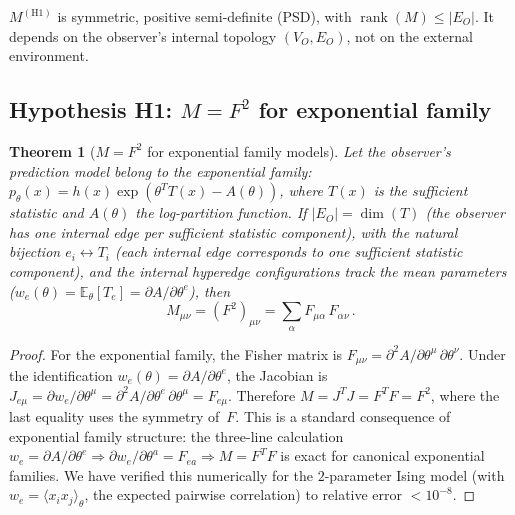 \documentclass[11pt]{article}
\newtheorem{theorem}{Theorem}[section]
\theoremstyle{definition}
\theoremstyle{remark}
\begin{document}
$M^{(\mathrm{H1})}$ is symmetric, positive semi-definite (PSD), with
$\operatorname{rank}(M) \leq |E_O|$.
It depends on the observer's internal topology $(V_O, E_O)$, not on the
external environment.

\subsection{Hypothesis H1: $M = F^2$ for exponential family}
\label{sec:M-equals-F-squared}

\begin{theorem}[$M = F^2$ for exponential family models]
\label{thm:M-F-squared}
Let the observer's prediction model belong to the exponential family:
$p_\theta(x) = h(x) \exp(\theta^T T(x) - A(\theta))$, where $T(x)$ is
the sufficient statistic and $A(\theta)$ the log-partition function.
If $|E_O| = \dim(T)$ (the observer has one internal edge per sufficient
statistic component), with the natural bijection $e_i \leftrightarrow T_i$ (each internal
edge corresponds to one sufficient statistic component), and
the internal hyperedge configurations track the \emph{mean parameters}
($w_e(\theta) = \mathbb{E}_\theta[T_e] = \partial A / \partial\theta^e$),
then
\begin{equation}
\label{eq:M-F-squared}
M_{\mu\nu} = (F^2)_{\mu\nu} =
\sum_{\alpha} F_{\mu\alpha}\, F_{\alpha\nu}\,.
\end{equation}
\end{theorem}

\begin{proof}
For the exponential family, the Fisher matrix is
$F_{\mu\nu} = \partial^2 A / \partial\theta^\mu\, \partial\theta^\nu$.
Under the identification $w_e(\theta) = \partial A / \partial\theta^e$,
the Jacobian is
$J_{e\mu} = \partial w_e / \partial\theta^\mu
= \partial^2 A / \partial\theta^e\, \partial\theta^\mu = F_{e\mu}$.
Therefore $M = J^T J = F^T F = F^2$, where the last equality uses
the symmetry of~$F$.
This is a standard consequence of exponential family structure: the
three-line calculation $w_e = \partial A/\partial\theta^e \Rightarrow
\partial w_e/\partial\theta^a = F_{ea} \Rightarrow M = F^T F$ is exact
for canonical exponential families.
We have verified this numerically for the $2$-parameter Ising model
(with $w_e = \langle x_i x_j \rangle_\theta$, the expected
pairwise correlation) to relative error $< 10^{-8}$.
\end{proof}
\end{document}
